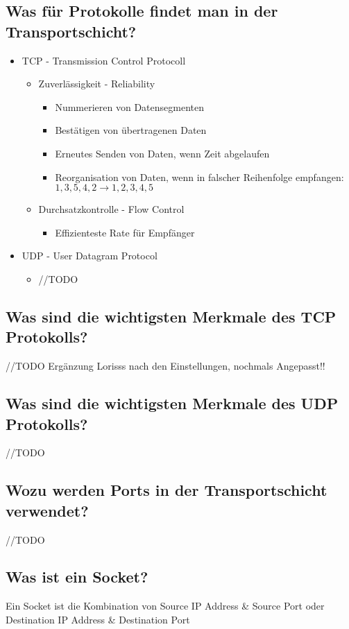 \subsection*{Was für Protokolle findet man in der Transportschicht?}
\begin{itemize}
    \item TCP - Transmission Control Protocoll
    \begin{itemize}
        \item Zuverlässigkeit - Reliability
        \begin{itemize}
            \item Nummerieren von Datensegmenten
            \item Bestätigen von übertragenen Daten
            \item Erneutes Senden von Daten, wenn Zeit abgelaufen
            \item Reorganisation von Daten, wenn in falscher Reihenfolge empfangen: $1,3,5,4,2 \rightarrow 1,2,3,4,5$
        \end{itemize}
        \item Durchsatzkontrolle - Flow Control
        \begin{itemize}
            \item Effizienteste Rate für Empfänger
        \end{itemize}
    \end{itemize}
    \item UDP - User Datagram Protocol
    \begin{itemize}
        \item //TODO
    \end{itemize}
\end{itemize}
\subsection*{Was sind die wichtigsten Merkmale des TCP Protokolls?}
//TODO
Ergänzung Lorisss nach den Einstellungen, nochmals Angepasst!!
\subsection*{Was sind die wichtigsten Merkmale des UDP Protokolls?}
//TODO
\subsection*{Wozu werden Ports in der Transportschicht verwendet?}
//TODO
\subsection*{Was ist ein Socket?}
Ein Socket ist die Kombination von Source IP Address \& Source Port oder Destination IP Address \& Destination Port
